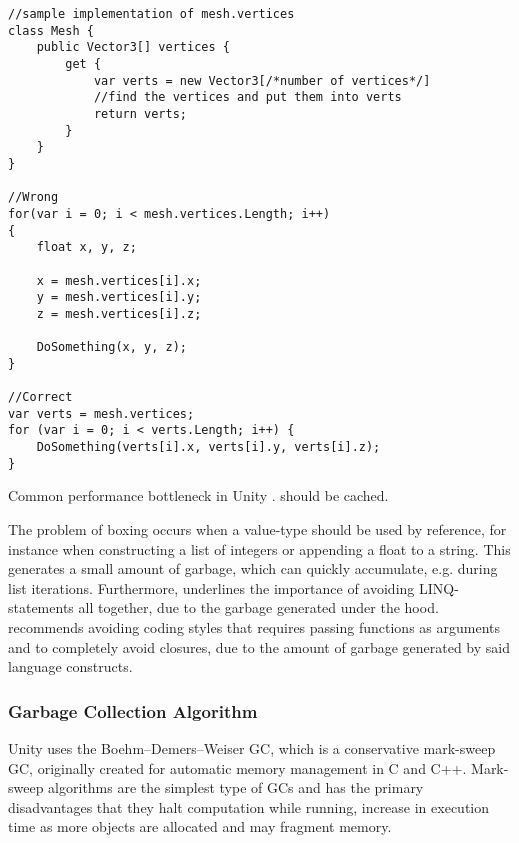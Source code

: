 \begin{listing}
\begin{verbatim}
//sample implementation of mesh.vertices
class Mesh {
    public Vector3[] vertices {
        get {
            var verts = new Vector3[/*number of vertices*/]
            //find the vertices and put them into verts
            return verts;
        }
    }
}

//Wrong
for(var i = 0; i < mesh.vertices.Length; i++)
{
    float x, y, z;

    x = mesh.vertices[i].x;
    y = mesh.vertices[i].y;
    z = mesh.vertices[i].z;

    DoSomething(x, y, z);
}

//Correct
var verts = mesh.vertices;
for (var i = 0; i < verts.Length; i++) {
    DoSomething(verts[i].x, verts[i].y, verts[i].z);
}
\end{verbatim}
\caption{Common performance bottleneck in Unity \cite{unity:heap}.  should be cached.} \label{lst:unity:array:prop}
\end{listing}

The problem of boxing occurs when a value-type should be used by reference, for instance when constructing a list of integers or appending a float to a string. This generates a small amount of garbage, which can quickly accumulate, e.g. during list iterations. Furthermore, \cite{unity:optimisation} underlines the importance of avoiding \gls{LINQ}-statements all together, due to the garbage generated under the hood. \cite{unity:heap} recommends avoiding coding styles that requires passing functions as arguments and to completely avoid closures, due to the amount of garbage generated by said language constructs.

\subsubsection{Garbage Collection Algorithm}
Unity uses the Boehm–Demers–Weiser \gls{GC}, which is a conservative mark-sweep \gls{GC}\cite{unity:heap}, originally created for automatic memory management in C and C++\cite{boehm2007transparent}. Mark-sweep algorithms are the simplest type of \glspl{GC} and has the primary disadvantages that they halt computation while running, increase in execution time as more objects are allocated and may fragment memory\cite{sestoft2017programming}.

